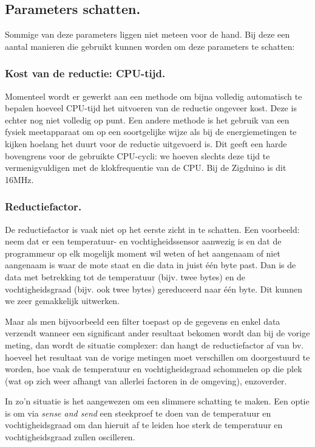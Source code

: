 \documentclass[11pt]{article}
\begin{document}
\subsection{Parameters schatten.} Sommige van deze parameters liggen niet meteen
voor de hand. Bij deze een aantal manieren die gebruikt kunnen worden om deze
parameters te schatten:

\subsubsection{Kost van de reductie: CPU-tijd.} Momenteel wordt er gewerkt aan een
methode om bijna volledig automatisch te bepalen hoeveel CPU-tijd het uitvoeren
van de reductie ongeveer kost. Deze is echter nog niet volledig op punt. Een
andere methode is het gebruik van een fysiek meetapparaat om op een soortgelijke
wijze als bij de energiemetingen te kijken hoelang het duurt voor de reductie
uitgevoerd is. Dit geeft een harde bovengrens voor de gebruikte CPU-cycli: we
hoeven slechts deze tijd te vermenigvuldigen met de klokfrequentie van de
CPU. Bij de Zigduino is dit 16MHz.

\subsubsection{Reductiefactor.} De reductiefactor is vaak
niet op het eerste zicht in te schatten. Een voorbeeld: neem dat er een
temperatuur- en vochtigheidssensor aanwezig is en dat de programmeur op elk mogelijk moment
 wil weten of het aangenaam of niet aangenaam is waar de mote staat en die data
in juist \'e\'en byte past. Dan is de data met betrekking tot de temperatuur (bijv.
twee bytes) en de vochtigheidsgraad (bijv. ook twee bytes) gereduceerd naar
\'e\'en byte. Dit kunnen we zeer gemakkelijk uitwerken.

Maar als men bijvoorbeeld een filter toepast op de gegevens en enkel data
verzendt wanneer een significant ander resultaat bekomen wordt dan bij de vorige
meting, dan wordt de situatie complexer: dan hangt de reductiefactor af van bv.
hoeveel het resultaat van de vorige metingen moet verschillen om doorgestuurd te
worden, hoe vaak de temperatuur en vochtigheidsgraad schommelen op die plek (wat
op zich weer afhangt van allerlei factoren in de omgeving), enzoverder.

In zo'n situatie is het aangewezen om een slimmere schatting te maken. Een optie
is om via \textit{sense and send} een steekproef te doen van de temperatuur en
vochtigheidsgraad om dan hieruit af te leiden hoe sterk de temperatuur en
vochtigheidsgraad zullen oscilleren.
\end{document}
